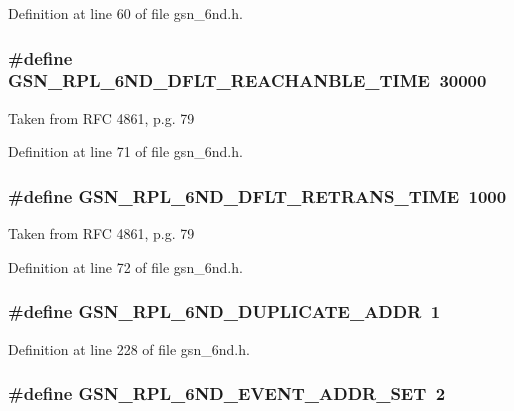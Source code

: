 Definition at line 60 of file gsn\_\-6nd.h.

\hypertarget{a00473_a3039f7d9f2d24633734777147ec84fc0}{
\subsubsection[{GSN\_\-RPL\_\-6ND\_\-DFLT\_\-REACHANBLE\_\-TIME}]{\setlength{\rightskip}{0pt plus 5cm}\#define GSN\_\-RPL\_\-6ND\_\-DFLT\_\-REACHANBLE\_\-TIME~30000}}
\label{a00473_a3039f7d9f2d24633734777147ec84fc0}
Taken from RFC 4861, p.g. 79 

Definition at line 71 of file gsn\_\-6nd.h.

\hypertarget{a00473_ae631ace4f672c62f6cf26184663a1a64}{
\subsubsection[{GSN\_\-RPL\_\-6ND\_\-DFLT\_\-RETRANS\_\-TIME}]{\setlength{\rightskip}{0pt plus 5cm}\#define GSN\_\-RPL\_\-6ND\_\-DFLT\_\-RETRANS\_\-TIME~1000}}
\label{a00473_ae631ace4f672c62f6cf26184663a1a64}
Taken from RFC 4861, p.g. 79 

Definition at line 72 of file gsn\_\-6nd.h.

\hypertarget{a00473_af8211abe83615504c44e6799a9b07668}{
\subsubsection[{GSN\_\-RPL\_\-6ND\_\-DUPLICATE\_\-ADDR}]{\setlength{\rightskip}{0pt plus 5cm}\#define GSN\_\-RPL\_\-6ND\_\-DUPLICATE\_\-ADDR~1}}
\label{a00473_af8211abe83615504c44e6799a9b07668}


Definition at line 228 of file gsn\_\-6nd.h.

\hypertarget{a00473_a1e5556bde56a94bac3a24077d63387a9}{
\subsubsection[{GSN\_\-RPL\_\-6ND\_\-EVENT\_\-ADDR\_\-SET}]{\setlength{\rightskip}{0pt plus 5cm}\#define GSN\_\-RPL\_\-6ND\_\-EVENT\_\-ADDR\_\-SET~2}}
\label{a00473_a1e5556bde56a94bac3a24077d63387a9}



